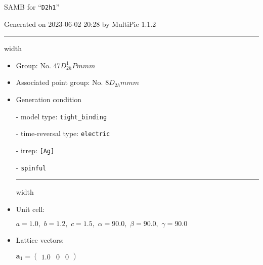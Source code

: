 \documentclass[fleqn,10pt,landscape]{article}
\begin{document}
\setcounter{MaxMatrixCols}{16}

\setlength{\baselineskip}{16pt}
\footnotesize
\begin{center}
\LARGE
SAMB for ``\texttt{D2h1}''
\end{center}
\begin{flushright}
Generated on 2023-06-02 20:28 by MultiPie 1.1.2
\end{flushright}
\vspace{1cm}


 \hfil \hrule height 1mm width \textwidth \hfil

\begin{itemize}
\item Group: No. 47\quad$D_{2h}^{1}$\quad$Pmmm$\quad[ orthorhombic ]

\item Associated point group: No. 8\quad$D_{2h}$\quad$mmm$\quad[ orthorhombic ]

\vspace{5mm}

\item Generation condition

\quad - model type: \texttt{tight_binding}

\quad - time-reversal type: \texttt{electric}

\quad - irrep: \texttt{[Ag]}

\quad - \texttt{spinful}


 \hfil \hrule height 1mm width \textwidth \hfil

\item Unit cell:

\quad $a=1.0,\,\, b=1.2,\,\, c=1.5,\,\, \alpha=90.0,\,\, \beta=90.0,\,\, \gamma=90.0$

\item Lattice vectors:

\quad $\bm{a}_1=\begin{pmatrix} 1.0 & 0 & 0 \end{pmatrix}$


\end{itemize}
\end{document}
